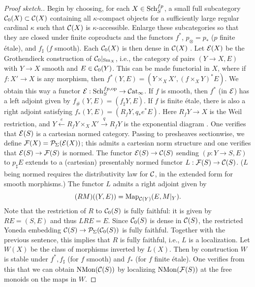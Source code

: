 \documentclass{amsart}
\numberwithin{proposition}{section}
\numberwithin{equation}{section}
\def\NMon{\mathrm{NMon}}
\begin{document}
\begin{proof}[Proof sketch.]
Begin by choosing, for each $X\in\mathrm{S}\mathrm{ch}{}_S^{fp}$, a small full subcategory $\mathcal C_0(X)\subset\mathcal C(X)$ containing all $\kappa$-compact objects for a sufficiently large regular cardinal $\kappa$ such that $\mathcal C(X)$ is $\kappa$-accessible.
Enlarge these subcategories so that they are closed under finite coproducts and the functors $f^*$, $p_\otimes=p_*$ ($p$ finite étale), and $f_\sharp$ ($f$ smooth).
Each $\mathcal C_0(X)$ is then dense in $\mathcal C(X)$ \cite[Proposition~5.3.5.11]{lurie-htt}.
Let $\mathcal E(X)$ be the Grothendieck construction of $\mathcal C_0|_{{\mathrm{S}\mathrm{m}}_X}$, i.e., the category of pairs $(Y \to X, E)$ with $Y \to X$ smooth and $E \in \mathcal C_0(Y)$.
This can be made functorial in $X$, where if $f: X' \to X$ is any morphism, then $f^*(Y, E) = (Y \times_X X', (f \times_X Y)^* E)$.
We obtain this way a functor $\mathcal E: \mathrm{S}\mathrm{ch}{}_S^{fp,\mathrm{op}} \to \mathcal{C}\mathrm{at}{}_\infty$.
If $f$ is smooth, then $f^*$ (in $\mathcal E$) has a left adjoint given by $f_\#(Y, E) = (f_\sharp Y, E)$.
If $f$ is finite étale, there is also a right adjoint satisfying $f_*(Y, E) = (R_f Y, q_*e^* E)$.
Here $R_f Y \to X$ is the Weil restriction, and $Y \xleftarrow{e} R_f Y \times_X X' \xrightarrow{q} R_f Y$ is the exponential diagram \cite[\S5.2, diagram~(5.7)]{bachmann-norms}.
One verifies that $\mathcal E(S)$ is a cartesian normed category.
Passing to presheaves sectionwise, we define $\mathcal F(X) = \mathcal{P}_\Sigma(\mathcal E(X))$; this admits a cartesian norm structure and one verifies that $\mathcal E(S) \to \mathcal F(S)$ is normed.
The functor $\mathcal E(S) \to \mathcal C(S)$ sending $(p: Y \to S, E)$ to $p_\sharp E$ extends to a (cartesian) presentably normed functor $L: \mathcal F(S) \to \mathcal C(S)$.
($L$ being normed requires the distributivity law for $\mathcal C$, in the extended form for smooth morphisms.)
The functor $L$ admits a right adjoint given by \[ (RM)((Y, E)) = \mathrm{Map}_{\mathcal C(Y)}(E, M|_Y). \]
Note that the restriction of $R$ to $\mathcal C_0(S)$ is fully faithful: it is given by $RE = (S, E)$ and thus $LRE = E$.
Since $\mathcal C_0(S)$ is dense in $\mathcal C(S)$, the restricted Yoneda embedding $\mathcal C(S)\to\mathcal{P}_\Sigma(\mathcal C_0(S))$ is fully faithful.
Together with the previous sentence, this implies that $R$ is fully faithful, i.e., $L$ is a localization.
Let $W(X)$ be the class of morphisms inverted by $L(X)$.
Then by construction $W$ is stable under $f^*, f_\sharp$ (for $f$ smooth) and $f_*$ (for $f$ finite étale).
One verifies from this that we can obtain $\NMon(\scr C(S))$ by localizing $\NMon(\scr F(S))$ at the free monoids on the maps in $W$.


\end{proof}
\end{document}
